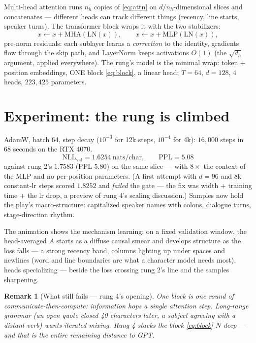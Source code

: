 \documentclass[11pt]{article}
\newtheorem{remark}{Remark}
\begin{document}
Multi-head attention runs $n_h$ copies of \eqref{eq:attn} on
$d/n_h$-dimensional slices and concatenates --- different heads can
track different things (recency, line starts, speaker turns). The
transformer block wraps it with the two stabilizers:
\begin{equation}
  x \leftarrow x + \mathrm{MHA}(\mathrm{LN}(x)), \qquad
  x \leftarrow x + \mathrm{MLP}(\mathrm{LN}(x)),
  \label{eq:block}
\end{equation}
pre-norm residuals: each sublayer learns a \emph{correction} to the
identity, gradients flow through the skip path, and LayerNorm keeps
activations $O(1)$ (the $\sqrt{d_h}$ argument, applied everywhere).
The rung's model is the minimal wrap: token + position embeddings, ONE
block \eqref{eq:block}, a linear head; $T = 64$, $d = 128$, $4$ heads,
$223{,}425$ parameters.

\section{Experiment: the rung is climbed}

AdamW, batch 64, step decay ($10^{-3}$ for 12k steps, $10^{-4}$ for
4k): $16{,}000$ steps in $68$ seconds on the RTX 4070.
\begin{equation}
  \boxed{\;\mathrm{NLL}_{\mathrm{val}} = 1.6254 \ \text{nats/char},
  \qquad \mathrm{PPL} = 5.08\;}
  \label{eq:result}
\end{equation}
against rung 2's $1.7583$ (PPL $5.80$) on the same slice --- with
$8\times$ the context of the MLP and no per-position parameters.
(A first attempt with $d = 96$ and 8k constant-lr steps scored
$1.8252$ and \emph{failed} the gate --- the fix was width + training
time + the lr drop, a preview of rung 4's scaling discussion.)
Samples now hold the play's macro-structure: capitalized speaker names
with colons, dialogue turns, stage-direction rhythm.

The animation shows the mechanism learning: on a fixed validation
window, the head-averaged $A$ starts as a diffuse causal smear and
develops structure as the loss falls --- a strong recency band,
columns lighting up under spaces and newlines (word and line
boundaries are what a character model needs most), heads
specializing --- beside the loss crossing rung 2's line and the
samples sharpening.

\begin{remark}[What still fails --- rung 4's opening]
One block is one round of communicate-then-compute: information hops
a single attention step. Long-range grammar (an open quote closed 40
characters later, a subject agreeing with a distant verb) wants
\emph{iterated} mixing. Rung 4 stacks the block \eqref{eq:block} $N$
deep --- and that is the entire remaining distance to GPT.
\end{remark}
\end{document}
